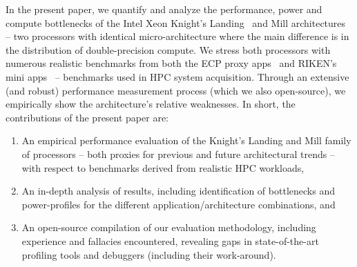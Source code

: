 In the present paper, we quantify and analyze the performance, power and compute bottlenecks of the
Intel Xeon Knight’s Landing~\cite{sodani_knights_2016} and Mill architectures~\cite{bradford_knights_2017} -- two
processors with identical micro-architecture where the main difference is in the distribution of double-precision compute.
We stress both processors with numerous realistic benchmarks from both the ECP proxy apps~\cite{noauthor_ecp_2018}
and RIKEN's mini apps~\cite{riken_aics_fiber_2015} -- benchmarks used in HPC system acquisition.
Through an extensive (and robust) performance measurement process (which we also open-source), we
empirically show the architecture’s relative weaknesses. In short, the contributions of the present paper are:
\begin{enumerate}
    \item An empirical performance evaluation of the Knight’s Landing and Mill family of processors -- both proxies for previous and future architectural trends -- with respect to benchmarks derived from realistic HPC workloads,
    \item  An in-depth analysis of results, including identification of bottlenecks and power-profiles for the different application/architecture combinations, and
    \item An open-source compilation of our evaluation methodology, including experience and fallacies encountered, revealing gaps in state-of-the-art profiling tools and debuggers (including their work-around).
\end{enumerate}
%
%

